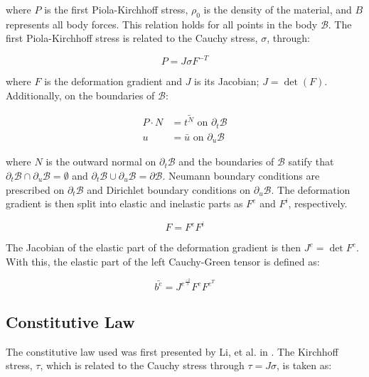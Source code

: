 \documentclass[conf]{new-aiaa}
\begin{document}
\noindent
where $P$ is the first Piola-Kirchhoff stress, 
$\rho_0$ is the density of the material, 
and
$B$ represents all body forces.
This relation holds for all points in the body $\mathcal{B}$.
The first Piola-Kirchhoff stress is related to 
the Cauchy stress, $\sigma$, through:

\begin{equation}
  P = J \sigma F^{-T}
\end{equation}

\noindent
where $F$ is the deformation gradient and
$J$ is its Jacobian; $J=\det(F)$.
Additionally, on the boundaries of $\mathcal{B}$:

\begin{align}
  P \cdot N &= \bar{t^{N}} \text{ on } \partial_t \mathcal{B} \\
          u &= \bar{u}     \text{ on } \partial_u \mathcal{B} 
\end{align}

\noindent
where $N$ is the outward normal on $\partial_t \mathcal{B}$
and the boundaries of $\mathcal{B}$ satify
that $\partial_t \mathcal{B} \cap \partial_u \mathcal{B} = \emptyset$
and
$\partial_t \mathcal{B} \cup \partial_u \mathcal{B} = \partial \mathcal{B}$.
Neumann boundary conditions are prescribed on $\partial_t \mathcal{B}$ 
and Dirichlet boundary conditions on $\partial_u \mathcal{B}$.
The deformation gradient is then split into elastic
and inelastic parts as $F^e$ and $F^i$, respectively.

\begin{equation}
  F = F^e F^i
\end{equation}

\noindent
The Jacobian of the elastic part of the deformation gradient
is then $J^e = \det{ F^e}$. 
With this, the elastic part of the left 
Cauchy-Green tensor is defined as:

\begin{equation}
  \bar{b^e} = J^{e^{\frac{-2}{3}}} F^e F^{e^T}
\end{equation}

\subsection{Constitutive Law}
\noindent
The constitutive law used was first presented by Li, et al. in 
\cite{li_simulation_of_finite_strain_inelastic_phenomena_governed_by_creep_and_plasticity}.
The Kirchhoff stress, $\tau$, which is 
related to the Cauchy stress through $\tau = J \sigma$,
is taken as:
\end{document}
